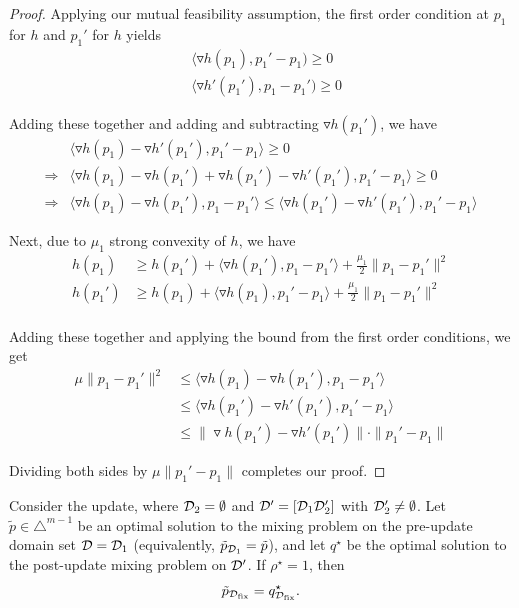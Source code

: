 \begin{proof}
Applying our mutual feasibility assumption, the first order condition at $p_1$ for $h$ and $p_1'$ for $h$ yields
\begin{align*}
    &\langle \triangledown h(p_1), p_1' - p_1) \ge 0 \\
    &\langle \triangledown h'(p_1'), p_1 - p_1') \ge 0
\end{align*}

Adding these together and adding and subtracting $\triangledown h(p_1')$, we have
\begin{align*}
    &\langle \triangledown h(p_1) - \triangledown h'(p_1'), p_1' - p_1 \rangle \ge 0 \\
    \Rightarrow &\langle \triangledown h(p_1) - \triangledown h(p_1') + \triangledown h(p_1') - \triangledown h'(p_1'), p_1' - p_1 \rangle \ge 0 \\
    \Rightarrow &\langle \triangledown h(p_1) - \triangledown h(p_1'), p_1 - p_1' \rangle \le \langle \triangledown h(p_1') - \triangledown h'(p_1'), p_1' - p_1 \rangle
\end{align*}

Next, due to $\mu_1$ strong convexity of $h$, we have
\begin{align*}
    h(p_1) &\ge h(p_1') + \langle \triangledown h(p_1'), p_1 - p_1' \rangle + \frac{\mu_1}{2} \| p_1 - p_1'\|^2 \\
    h(p_1') &\ge h(p_1) + \langle \triangledown h(p_1), p_1' - p_1 \rangle + \frac{\mu_1}{2} \| p_1 - p_1'\|^2 \\
\end{align*}

Adding these together and applying the bound from the first order conditions, we get
\begin{align*}
    \mu \| p_1 - p_1'\|^2 &\le \langle \triangledown h(p_1) - \triangledown h(p_1'), p_1 - p_1' \rangle  \\
    &\le \langle \triangledown h(p_1') - \triangledown h'(p_1'), p_1' - p_1 \rangle \\
    &\le \|\triangledown h(p_1') - \triangledown h'(p_1') \| \cdot \| p_1' - p_1\|
\end{align*}

Dividing both sides by $\mu \|p_1' - p_1\|$ completes our proof.
\end{proof}


\begin{lemma}[When $\tilde{p}_{\Dfix} = q^\star_{\Dfix}$ for adding]\label{lem:add_exactness}
Consider the \Add update, where $\mathcal{D}_2=\emptyset$ and $\mathcal{D}'=[\mathcal{D}_1\mathcal{D}_2']$ with $\mathcal{D}_2'\neq\emptyset$.
Let $\tilde p\in\triangle^{m-1}$ be an optimal solution to the mixing problem on the pre-update domain set $\mathcal{D}=\mathcal{D}_1$ (equivalently, $\tilde p_{\mathcal{D}_1}=\tilde p$), and let $q^\star$ be the optimal solution to the post-update mixing problem on $\mathcal{D}'$.
If $\rho^\star=1$, then
\[
\tilde p_{\mathcal{D}_{\text{fix}}} = q^\star_{\mathcal{D}_{\text{fix}}}.
\]
\end{lemma}

